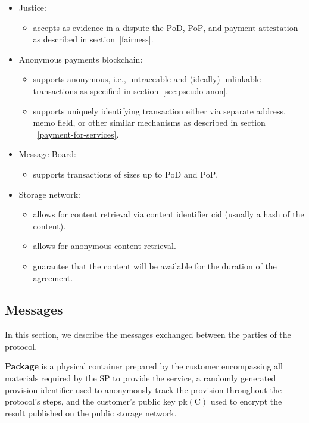 \begin{itemize}
\item Justice:
    \begin{itemize}
        \item accepts as evidence in a dispute the $\mathrm{PoD}$, $\mathrm{PoP}$, and payment $\mathrm{attestation}$ as described in section~\ref{fairness}.
    \end{itemize}

\item Anonymous payments blockchain:
    \begin{itemize}
        \item supports anonymous, i.e., untraceable and (ideally) unlinkable transactions as specified in section~\ref{sec:pseudo-anon}.
        \item supports uniquely identifying transaction either via separate address, memo field, or other similar mechanisms as described in section ~\ref{payment-for-services}. 
    \end{itemize}

\item Message Board:
    \begin{itemize}
        \item supports transactions of sizes up to $\mathrm{PoD}$ and $\mathrm{PoP}$.
    \end{itemize}

\item Storage network:
    \begin{itemize}
        \item allows for content retrieval via content identifier $\mathrm{cid}$ (usually a hash of the content).
        \item allows for anonymous content retrieval.
        \item guarantee that the content will be available for the duration of the agreement.
    \end{itemize}
\end{itemize}

\subsection{Messages}\label{messages}
In this section, we describe the messages exchanged between the parties of the protocol.

\vspace{5mm}

\noindent \textbf
{Package}\label{package} is a physical container prepared by the customer encompassing all $\mathrm{materials}$ required by the SP to provide the service, a randomly generated provision identifier used to anonymously track the provision throughout the protocol's steps, and the customer's public key $\mathrm{pk(C)}$ used to encrypt the result published on the public storage network.

